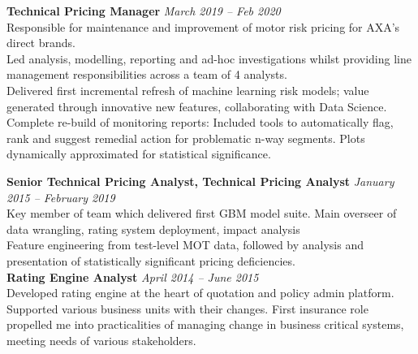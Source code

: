 \documentclass[11pt]{article}
\begin{document}
\begin{description}
\textbf{Technical Pricing Manager} \emph{March 2019 -- Feb 2020}\\
\textbullet \quad Responsible for maintenance and improvement of motor risk pricing for AXA's direct brands.\\
\textbullet \quad Led analysis, modelling, reporting and ad-hoc investigations whilst providing line management responsibilities across a team of 4 analysts.\\
\textbullet \quad Delivered first incremental refresh of machine learning risk models; value generated through innovative new features, collaborating with Data Science.\\
\textbullet \quad Complete re-build of monitoring reports: Included tools to automatically flag, rank and suggest remedial action for problematic n-way segments. Plots dynamically approximated for statistical significance.

\textbf{Senior Technical Pricing Analyst, Technical Pricing Analyst} \emph{January 2015 -- February 2019}\\
\textbullet \quad Key member of team which delivered first GBM model suite. Main overseer of data wrangling, rating system deployment, impact analysis\\
\textbullet \quad Feature engineering from test-level MOT data, followed by analysis and presentation of statistically significant pricing deficiencies.\\

\textbf{Rating Engine Analyst} \emph{April 2014 -- June 2015}\\
\textbullet \quad Developed rating engine at the heart of quotation and policy admin platform. Supported various business units with their changes. First insurance role propelled me into practicalities of managing change in business critical systems, meeting needs of various stakeholders.
\end{description}
\end{document}

